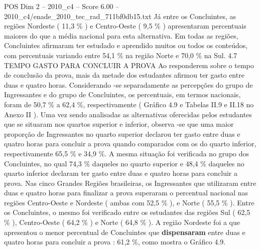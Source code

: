\begin{textsample}{POS Dim 2 – 2010\_c4 – Score 6.00 – 2010\_c4/enade\_2010\_tec\_rad\_711bf0db15.txt}
Já entre os Concluintes, as regiões Nordeste ( 11,3 \% ) e Centro-Oeste ( 9,5 \% ) apresentaram percentuais maiores do que a média nacional para esta alternativa.
Em todas as regiões, Concluintes afirmaram ter estudado e aprendido muitos ou todos os conteúdos, com percentuais variando entre 54,1 \% na região Norte e 70,0 \% na Sul. 4.7 TEMPO GASTO PARA CONCLUIR A PROVA Ao responderem sobre o tempo de conclusão da prova, mais da metade dos estudantes afirmou ter gasto entre duas e quatro horas.
Considerando -se separadamente as percepções do grupo de Ingressantes e do grupo de Concluintes, os percentuais, em termos nacionais, foram de 50,7 \% a 62,4 \%, respectivamente ( Gráfico 4.9 e Tabelas II.9 e II.18 no Anexo II ).
Uma vez sendo analisadas as alternativas oferecidas pelos estudantes que se situaram nos quartos superior e inferior, observa -se que uma maior proporção de Ingressantes no quarto superior declarou ter gasto entre duas e quatro horas para concluir a prova quando comparados com os do quarto inferior, respectivamente 65,5 \% e 34,9 \%.
A mesma situação foi verificada no grupo dos Concluintes, no qual 74,3 \% daqueles no quarto superior e 48,4 \% daqueles no quarto inferior declaram ter gasto entre duas e quatro horas para concluir a prova.
Nas cinco Grandes Regiões brasileiras, os Ingressantes que utilizaram entre duas e quatro horas para finalizar a prova superaram o percentual nacional nas regiões Centro-Oeste e Nordeste ( ambas com 52,5 \% ), e Norte ( 55,5 \% ).
Entre os Concluintes, o mesmo foi verificado entre os estudantes das regiões Sul ( 62,5 \% ), Centro-Oeste ( 64,2 \% ) e Norte ( 64,8 \% ).
A região Nordeste foi a que apresentou o menor percentual de Concluintes que \textbf{dispensaram} entre duas e quatro horas para concluir a prova : 61,2 \%, como mostra o Gráfico 4.9.

\end{textsample}
